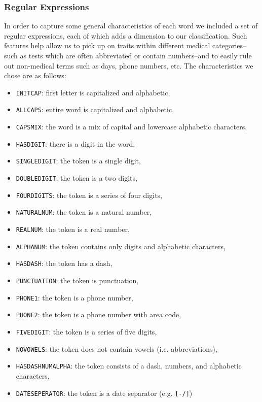 \documentclass[preprint]{style}
\begin{document}
\subsubsection{Regular Expressions}
In order to capture some general characteristics of each word we included a set of regular expressions, each of which adds a dimension to our classification. Such features help allow us to pick up on traits within different medical categories--such as tests which are often abbreviated or contain numbers--and to easily rule out non-medical terms such as days, phone numbers, etc. The characteristics we chose are as follows:
\begin{itemize}
\item {\tt INITCAP}: first letter is capitalized and alphabetic,
\item {\tt ALLCAPS}: entire word is capitalized and alphabetic,
\item {\tt CAPSMIX}: the word is a mix of capital and lowercase alphabetic characters,
\item {\tt HASDIGIT}: there is a digit in the word,
\item {\tt SINGLEDIGIT}: the token is a single digit,
\item {\tt DOUBLEDIGIT}: the token is a two digits,
\item {\tt FOURDIGITS}: the token is a series of four digits,
\item {\tt NATURALNUM}: the token is a natural number,
\item {\tt REALNUM}: the token is a real number,
\item {\tt ALPHANUM}: the token contains only digits and alphabetic characters,
\item {\tt HASDASH}: the token has a dash,
\item {\tt PUNCTUATION}: the token is punctuation,
\item {\tt PHONE1}: the token is a phone number,
\item {\tt PHONE2}: the token is a phone number with area code,
\item {\tt FIVEDIGIT}: the token is a series of five digits,
\item {\tt NOVOWELS}: the token does not contain vowels (i.e. abbreviations),
\item {\tt HASDASHNUMALPHA}: the token consists of a dash, numbers, and alphabetic characters, 
\item {\tt DATESEPERATOR}: the token is a date separator (e.g. {\tt [-/]})
\end{itemize}
\end{document}
